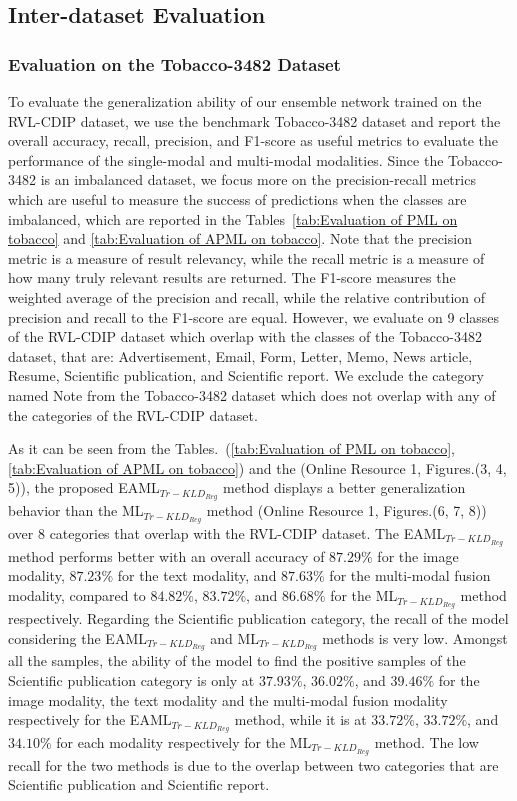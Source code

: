 \documentclass[twocolumn]{svjour3}
\begin{document}
\subsection{Inter-dataset Evaluation}

\subsubsection{Evaluation on the Tobacco-3482 Dataset}
\label{subsubsec:Evaluation on the Tobacco-3482 Dataset}

To evaluate the generalization ability of our ensemble network trained on the RVL-CDIP dataset, we use the benchmark Tobacco-3482 dataset and report the overall accuracy, recall, precision, and F1-score as useful metrics to evaluate the performance of the single-modal and multi-modal modalities. Since the Tobacco-3482 is an imbalanced dataset, we focus more on the precision-recall metrics which are useful to measure the success of predictions when the classes are imbalanced, which are reported in the Tables~\ref{tab:Evaluation of PML on tobacco} and \ref{tab:Evaluation of APML on tobacco}. Note that the precision metric is a measure of result relevancy, while the recall metric is a measure of how many truly relevant results are returned. The F1-score measures the weighted average of the precision and recall, while the relative contribution of precision and recall to the F1-score are equal.                                                                
However, we evaluate on 9 classes of the RVL-CDIP dataset which overlap with the classes of the Tobacco-3482 dataset, that are: Advertisement, Email, Form, Letter, Memo, News article, Resume, Scientific publication, and Scientific report. We exclude the category named Note from the Tobacco-3482 dataset which does not overlap with any of the categories of the RVL-CDIP dataset.

As it can be seen from the Tables.~(\ref{tab:Evaluation of PML on tobacco}, \ref{tab:Evaluation of APML on tobacco}) and the (Online Resource 1, Figures.(3, 4, 5)), the proposed EAML$_{{Tr-KLD}_{Reg}}$ method displays a better generalization behavior than the ML$_{{Tr-KLD}_{Reg}}$ method (Online Resource 1, Figures.(6, 7, 8)) over 8 categories that overlap with the RVL-CDIP dataset. The EAML$_{{Tr-KLD}_{Reg}}$ method performs better with an overall accuracy of $87.29\%$ for the image modality, $87.23\%$ for the text modality, and $87.63\%$ for the multi-modal fusion modality, compared to $84.82\%$, $83.72\%$, and $86.68\%$ for the ML$_{{Tr-KLD}_{Reg}}$ method respectively.
Regarding the Scientific publication category, the recall of the model considering the EAML$_{{Tr-KLD}_{Reg}}$ and ML$_{{Tr-KLD}_{Reg}}$ methods is very low. Amongst all the samples, the ability of the model to find the positive samples of the Scientific publication category is only at $37.93\%$, $36.02\%$, and $39.46\%$ for the image modality, the text modality and the multi-modal fusion modality respectively for the EAML$_{{Tr-KLD}_{Reg}}$ method, while it is at $33.72\%$, $33.72\%$, and $34.10\%$ for each modality respectively for the ML$_{{Tr-KLD}_{Reg}}$ method. The low recall for the two methods is due to the overlap between two categories that are Scientific publication and Scientific report.
\end{document}
